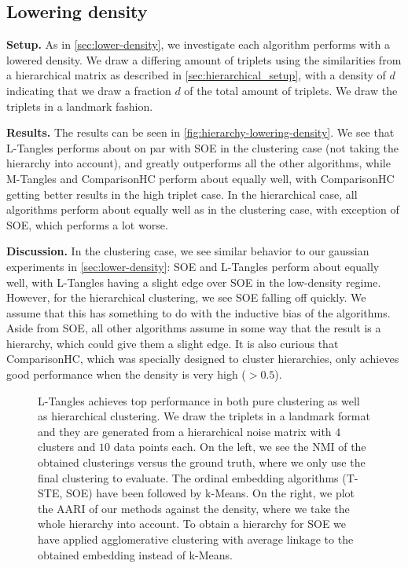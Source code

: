 \subsection{Lowering density}\label{sec:hierarchicall-lower-density}
\textbf{Setup.} As in \autoref{sec:lower-density}, we investigate each algorithm performs with a lowered density. We draw a differing amount of triplets
using the similarities from a hierarchical matrix as described in \autoref{sec:hierarchical_setup}, with a density of $d$ indicating that we draw a fraction $d$ of the total amount of triplets.
We draw the triplets in a landmark fashion. 

\noindent
\textbf{Results.}
The results can be seen in \autoref{fig:hierarchy-lowering-density}. 
We see that L-Tangles performs about on par with SOE in the clustering case (not taking the hierarchy into account), 
and greatly outperforms all the other algorithms, while M-Tangles and ComparisonHC perform about equally well, with ComparisonHC getting better results in the high triplet case.
In the hierarchical case, all algorithms perform about equally well as in the clustering case, with exception of SOE, which performs a lot worse.

\noindent
\textbf{Discussion.}
In the clustering case, we see similar behavior to our gaussian experiments in \autoref{sec:lower-density}: 
SOE and L-Tangles perform about equally well, with L-Tangles having a slight edge over SOE in the low-density regime. However, for the hierarchical clustering, we see SOE falling off quickly.
We assume that this has something to do with the inductive bias of the algorithms. Aside from SOE, all other algorithms assume in some way that the result is a hierarchy, which could give
them a slight edge. It is also curious that ComparisonHC, which was specially designed to cluster hierarchies, only achieves good performance when the density is very high ($>0.5$).

\onecolumn
\begin{figure}[ht]
    \centering
    \caption{
        L-Tangles achieves top performance in both pure clustering as well as hierarchical clustering. 
        We draw the triplets in a landmark format and they are generated from a hierarchical noise matrix with $4$ clusters and $10$ data points each. On the left, we see the NMI of 
        the obtained clusterings versus the ground truth, where we only use the final clustering to evaluate. The ordinal embedding algorithms
        (T-STE, SOE) have been followed by k-Means. On the right, 
        we plot the AARI of our methods against the density, where we take the whole hierarchy into account. To obtain a hierarchy for SOE
        we have applied agglomerative clustering with average linkage to the obtained embedding instead of k-Means.
    }
    \label{fig:hierarchy-lowering-density}
\end{figure}

